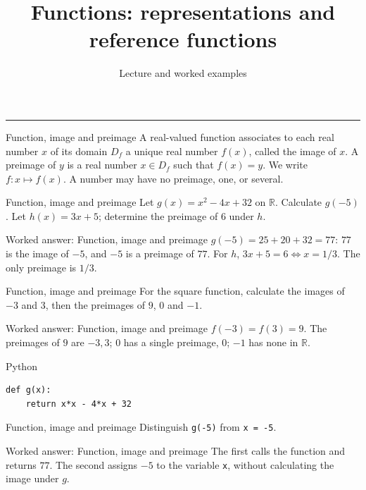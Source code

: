 \documentclass[aspectratio=169,10pt]{beamer}
\title{Functions: representations and reference functions}
\subtitle{Lecture and worked examples}
\date{}
\author{}
\providecommand{\R}{\mathbb{R}}
\begin{document}
\begin{frame}[plain]
\vfill
{\inserttitle\par}
\medskip
{\insertsubtitle\par}
\medskip
{\rule{\textwidth}{.5pt}}
\vfill
\end{frame}
\begin{frame}{Function, image and preimage}
A real-valued function associates to each real number \(x\) of its domain \(D_f\) a unique real number \(f(x)\), called the image of \(x\). A preimage of \(y\) is a real number \(x\in D_f\) such that \(f(x)=y\). We write \(f:x\mapsto f(x)\). A number may have no preimage, one, or several.
\end{frame}
\begin{frame}{Function, image and preimage}
Let \(g(x)=x^2-4x+32\) on \(\R\). Calculate \(g(-5)\). Let \(h(x)=3x+5\); determine the preimage of \(6\) under \(h\).
\end{frame}
\begin{frame}{Worked answer: Function, image and preimage}
\(g(-5)=25+20+32=77\): \(77\) is the image of \(-5\), and \(-5\) is a preimage of \(77\). For \(h\), \(3x+5=6\iff x=1/3\). The only preimage is \(1/3\).
\end{frame}
\begin{frame}{Function, image and preimage}
For the square function, calculate the images of \(-3\) and \(3\), then the preimages of \(9\), \(0\) and \(-1\).
\end{frame}
\begin{frame}{Worked answer: Function, image and preimage}
\(f(-3)=f(3)=9\). The preimages of \(9\) are \(-3,3\); \(0\) has a single preimage, \(0\); \(-1\) has none in \(\R\).
\end{frame}
\begin{frame}[fragile]{Python}
\small
\begin{verbatim}
def g(x):
    return x*x - 4*x + 32
\end{verbatim}
\end{frame}
\begin{frame}{Function, image and preimage}
Distinguish \texttt{g(-5)} from \texttt{x = -5}.
\end{frame}
\begin{frame}{Worked answer: Function, image and preimage}
The first calls the function and returns \(77\). The second assigns \(-5\) to the variable \texttt{x}, without calculating the image under \(g\).
\end{frame}
\end{document}
